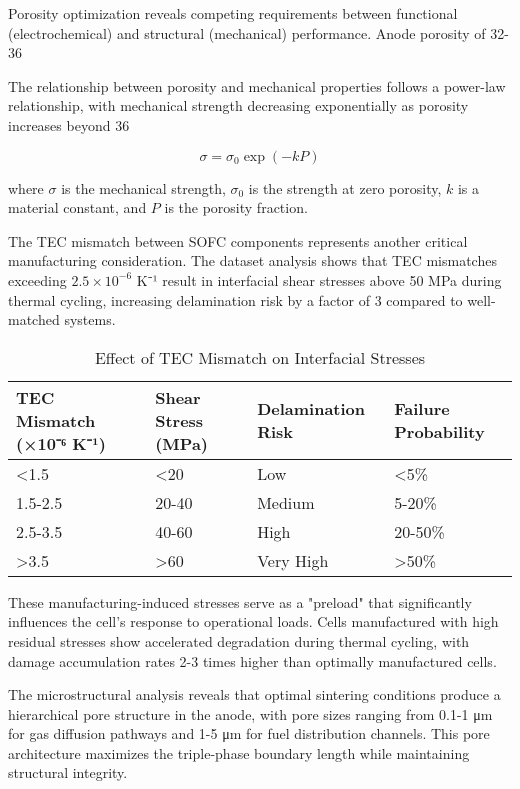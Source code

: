 \documentclass[10pt,conference]{IEEEtran}
\begin{document}
Porosity optimization reveals competing requirements between functional (electrochemical) and structural (mechanical) performance. Anode porosity of 32-36%

The relationship between porosity and mechanical properties follows a power-law relationship, with mechanical strength decreasing exponentially as porosity increases beyond 36%

\begin{equation}
\sigma = \sigma_0 \exp(-k P)
\end{equation}

where $\sigma$ is the mechanical strength, $\sigma_0$ is the strength at zero porosity, $k$ is a material constant, and $P$ is the porosity fraction.

The TEC mismatch between SOFC components represents another critical manufacturing consideration. The dataset analysis shows that TEC mismatches exceeding $2.5 \times 10^{-6}$ K⁻¹ result in interfacial shear stresses above 50 MPa during thermal cycling, increasing delamination risk by a factor of 3 compared to well-matched systems.

\begin{table}[H]
\centering
\caption{Effect of TEC Mismatch on Interfacial Stresses}
\label{tab:tec_stress}
\begin{tabular}{@{}llll@{}}
\toprule
TEC Mismatch (×10⁻⁶ K⁻¹) & Shear Stress (MPa) & Delamination Risk & Failure Probability \\
\midrule
<1.5 & <20 & Low & <5\% \\
1.5-2.5 & 20-40 & Medium & 5-20\% \\
2.5-3.5 & 40-60 & High & 20-50\% \\
>3.5 & >60 & Very High & >50\% \\
\bottomrule
\end{tabular}
\end{table}

These manufacturing-induced stresses serve as a "preload" that significantly influences the cell's response to operational loads. Cells manufactured with high residual stresses show accelerated degradation during thermal cycling, with damage accumulation rates 2-3 times higher than optimally manufactured cells.

The microstructural analysis reveals that optimal sintering conditions produce a hierarchical pore structure in the anode, with pore sizes ranging from 0.1-1 μm for gas diffusion pathways and 1-5 μm for fuel distribution channels. This pore architecture maximizes the triple-phase boundary length while maintaining structural integrity.
\end{document}
